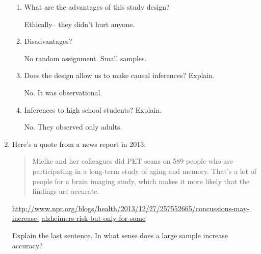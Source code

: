 \begin{enumerate}
\begin{enumerate}
\item  What are the advantages of this study design?
\begin{students}
 \vfill
\end{students}

\begin{key}
 Ethically-- they didn't hurt anyone.
\end{key}

\item Disadvantages?
\begin{students}
 \vfill
\end{students}

\begin{key}
No random assignment.  Small samples.
\end{key}

\item Does the design allow us to make causal    inferences?  Explain.
\begin{students}
 \vspace{.6cm}
\end{students}

\begin{key} No.  It was observational.
\end{key}

\item Inferences to high school students? Explain.
\begin{students}
\vspace*{.6cm}
\newpage
\end{students}

\begin{key} No. They observed only adults.
\end{key}

\end{enumerate}

\item Here's a quote from a news report in 2013:
{\footnotesize
  \begin{quotation}
Mielke and her colleagues did PET scans on 589 people who are
participating in a long-term study of aging and memory. That's a lot
of people for a brain imaging study, which makes it more likely that
the findings are accurate. 
  \end{quotation}
}
\url{http://www.npr.org/blogs/health/2013/12/27/257552665/concussions-may-increase-}
\url{alzheimers-risk-but-only-for-some}

Explain the last sentence.  In what sense does a large sample increase accuracy?


\end{enumerate}

